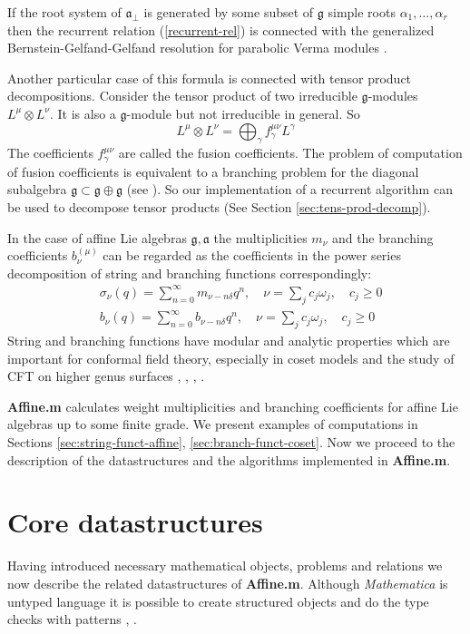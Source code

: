 \documentclass[preprint,12pt]{elsarticle}
\newcommand{\gf}{\mathfrak{g}}
\newcommand{\af}{\mathfrak{a}}
\newcommand{\afb}{\mathfrak{a}_{\bot}}
\begin{document}
If the root system of $\afb$ is generated by some subset of $\gf$
simple roots $\alpha_{1},\dots,\alpha_{r}$ then the recurrent
relation (\ref{recurrent-rel}) is connected with the generalized
Bernstein-Gelfand-Gelfand resolution for parabolic Verma modules
\cite{2011arXiv1102.1702L}.

Another particular case of this formula is connected with tensor
product decompositions. Consider the tensor product of two
irreducible $\gf$-modules $L^{\mu}\otimes L^{\nu}$. It is also a
$\gf$-module but not irreducible in general. So
\begin{equation}
  \label{eq:19}
  L^{\mu}\otimes L^{\nu}=\bigoplus_{\gamma} f^{\mu\nu}_{\gamma}L^{\gamma}
\end{equation}
The coefficients $f^{\mu\nu}_{\gamma}$ are called the fusion
coefficients. The problem of computation of fusion coefficients is
equivalent to a branching problem for the diagonal subalgebra
$\gf\subset \gf\oplus \gf$ (see \cite{LyakhovskyPostnova2011}). So our implementation of a recurrent algorithm can be used to decompose tensor products (See Section \ref{sec:tens-prod-decomp}).

In the case of affine Lie algebras $\gf, \af$  the multiplicities
$m_{\nu}$ and the branching coefficients $b^{(\mu)}_{\nu}$
can be regarded as the coefficients in the power series decomposition
of string and branching functions correspondingly:
\begin{align}
  \label{eq:21}
  &\sigma_{\nu}(q)=\sum_{n=0}^{\infty} m_{\nu-n\delta} q^n, \quad \nu=\sum_j c_j \omega_j,\quad c_j\geq 0\\
  & b_{\nu}(q)=\sum_{n=0}^{\infty} b_{\nu-n\delta} q^n,\quad  \nu=\sum_j c_j \omega_j, \quad c_j\geq 0
\end{align}
String and branching functions have  modular and analytic properties which are important for conformal field theory, especially in  coset models and the study of CFT on higher genus surfaces \cite{kac1988modular}, \cite{difrancesco1997cft}, \cite{Walton:1999xc}, \cite{walton1989conformal}.


{\bf Affine.m}  calculates weight multiplicities and branching coefficients for affine Lie algebras up to some finite grade. We present examples of computations in Sections \ref{sec:string-funct-affine}, \ref{sec:branch-funct-coset}. Now we proceed to the description of the datastructures and the algorithms implemented in {\bf Affine.m}.

\section{Core datastructures}
\label{sec:core-datastructures} Having introduced necessary
mathematical objects, problems and relations we now describe the
related datastructures of {\bf Affine.m}. Although {\it
Mathematica} is untyped language it is possible to create
structured objects and do the type checks with patterns
\cite{shifrinmathematica}, \cite{maeder2000computer}.
\end{document}
